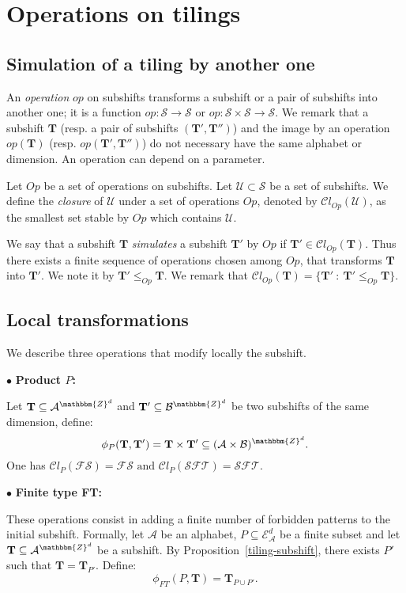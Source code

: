 \documentclass[proceedings]{stacs}
\theoremstyle{plain}\newtheorem{satz}[thm]{Satz}
\theoremstyle{definition}\newtheorem{crucial}[thm]{Crucial Definition}
\newcommand{\Z}{\mathbbm{Z}}
\newcommand{\A}{\mathcal{A}}
\newcommand{\E}{\mathcal{E}}
\newcommand{\T}{\mathbf{T}}
\newcommand{\SFT}{\mathcal{SFT}}
\newcommand{\shift}{\mathcal{S}}
\newcommand{\fshift}{\mathcal{FS}}
\newcommand{\Uclass}{\mathcal{U}}
\begin{document}
\section{Operations on tilings}\label{operation}

	\subsection{Simulation of a tiling by another one}

An \emph{operation} $op$ on subshifts transforms a subshift or a pair of subshifts into another one; it is a function $op:\shift\to\shift$ or $op:\shift\times\shift\to\shift$. We remark that a subshift $\T$ (resp. a pair of subshifts $(\T',\T'')$) and the image by an operation $op(\T)$ (resp. $op(\T',\T'')$) do not necessary have the same alphabet or dimension. An operation can depend on a parameter.

Let $Op$ be a set of operations on subshifts. Let $\Uclass\subset\shift$ be a set of subshifts. We define the \emph{closure} of $\Uclass$ under a set of operations $Op$, denoted by $\mathcal{C}l_{Op}(\Uclass)$, as the smallest set stable by $Op$ which contains $\Uclass$. 

We say that a subshift $\T$ \emph{simulates} a subshift $\T'$ by $Op$ if $\T'\in\mathcal{C}l_{Op}(\T)$. Thus there exists a finite sequence of operations chosen among $Op$, that transforms $\T$ into $\T'$. We note it by $\T'\leq_{Op}\T$. We remark that $\mathcal{C}l_{Op}(\T)= \{ \T'\ :\  \T'\leq_{Op}\T\}.$

	\subsection{Local transformations}

We describe three operations that modify locally the subshift.

\noindent$\bullet$ \textbf{Product $P$:}

Let $\T\subseteq\A^{\Z^d}$ and $\T'\subseteq\mathcal{B}^{\Z^d}$ be two subshifts of the same dimension, define: $$\phi_P(\T,\T')=\T\times\T'\subseteq(\A\times\mathcal{B})^{\Z^d}.$$
One has $\mathcal{C}l_{P}(\fshift)=\fshift\textrm{ and } \mathcal{C}l_{P}(\SFT)=\SFT.$

\noindent$\bullet$ \textbf{Finite type FT:}

These operations consist in adding a finite number of forbidden patterns to the initial subshift. Formally, let $\A$ be an alphabet, $P\subseteq\E_{\A}^d$ be a finite subset and let $\T\subseteq\A^{\Z^d}$ be a subshift. By Proposition~\ref{tiling-subshift}, there exists $P'$ such that $\T=\T_{P'}$. Define:
$$ \phi_{FT}(P,\T)= \T_{P\cup P'}.$$
\end{document}
